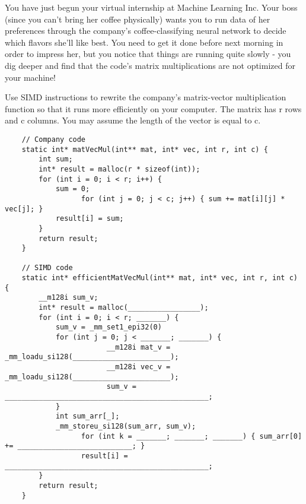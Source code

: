 \begin{blocksection}

\question
You have just begun your virtual internship at Machine Learning Inc. Your boss (since you can’t bring her coffee physically) wants you to run data of her preferences through the company’s coffee-classifying neural network to decide which flavors she’ll like best. You need to get it done before next morning in order to impress her, but you notice that things are running quite slowly - you dig deeper and find that the code’s matrix multiplications are not optimized for your machine!

Use SIMD instructions to rewrite the company’s matrix-vector multiplication function so that it runs more efficiently on your computer. The matrix has r rows and c columns. You may assume the length of the vector is equal to c.

\begin{verbatim}
    // Company code
    static int* matVecMul(int** mat, int* vec, int r, int c) {
        int sum;
        int* result = malloc(r * sizeof(int));
        for (int i = 0; i < r; i++) {
            sum = 0;
                  for (int j = 0; j < c; j++) { sum += mat[i][j] * vec[j]; }
            result[i] = sum;
        }
        return result;
    }
    
    // SIMD code
    static int* efficientMatVecMul(int** mat, int* vec, int r, int c) {
        __m128i sum_v;
        int* result = malloc(_________________);
        for (int i = 0; i < r; _______) {
            sum_v = _mm_set1_epi32(0)
            for (int j = 0; j < _______; _______) {
                        __m128i mat_v = _mm_loadu_si128(_______________________);
                        __m128i vec_v = _mm_loadu_si128(_______________________);
                        sum_v = ________________________________________________;
            }
            int sum_arr[_];
            _mm_storeu_si128(sum_arr, sum_v);
                  for (int k = _______; _______; _______) { sum_arr[0] += ___________________________; }
                  result[i] = ________________________________________________;
        }
        return result;
    }
\end{verbatim}
\end{blocksection}

